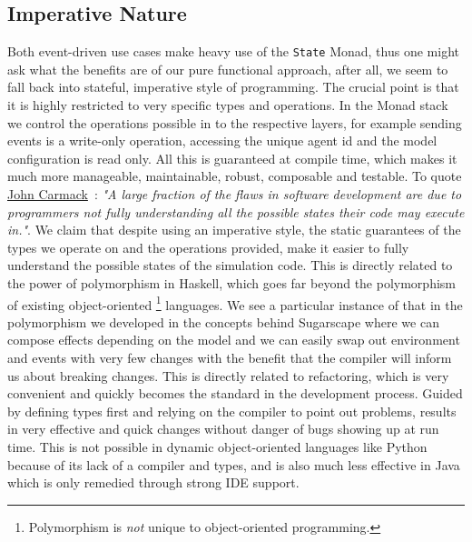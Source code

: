 \subsection{Imperative Nature}
Both event-driven use cases make heavy use of the \texttt{State} Monad, thus one might ask what the benefits are of our pure functional approach, after all, we seem to fall back into stateful, imperative style of programming.
The crucial point is that it is highly restricted to very specific types and operations. In the Monad stack we control the operations possible in to the respective layers, for example sending events is a write-only operation, accessing the unique agent id and the model configuration is read only. All this is guaranteed at compile time, which makes it much more manageable, maintainable, robust, composable and testable.
To quote \href{https://www.gamasutra.com/view/news/169296/Indepth_Functional_programming_in_C.php}{John Carmack}~\cite{gamasutra_carmack_fp}: \emph{"A large fraction of the flaws in software development are due to programmers not fully understanding all the possible states their code may execute in."}. We claim that despite using an imperative style, the static guarantees of the types we operate on and the operations provided, make it easier to fully understand the possible states of the simulation code.
This is directly related to the power of polymorphism in Haskell, which goes far beyond the polymorphism of existing object-oriented \footnote{Polymorphism is \textit{not} unique to object-oriented programming.} languages.
We see a particular instance of that in the polymorphism we developed in the concepts behind Sugarscape where we can compose effects depending on the model and we can easily swap out environment and events with very few changes with the benefit that the compiler will inform us about breaking changes. This is directly related to refactoring, which is very convenient and quickly becomes the standard in the development process. Guided by defining types first and relying on the compiler to point out problems, results in very effective and quick changes without danger of bugs showing up at run time. This is not possible in dynamic object-oriented languages like Python because of its lack of a compiler and types, and is also much less effective in Java which is only remedied through strong IDE support.

